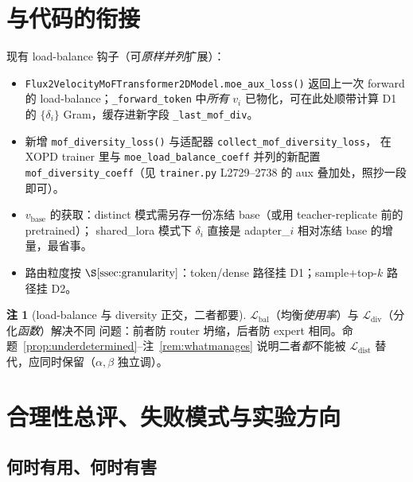 \documentclass[11pt,a4paper]{article}
\newcommand{\loss}{\mathcal{L}}
\newcommand{\base}{\mathrm{base}}
\newcommand{\vbase}{v_{\base}}
\theoremstyle{definition}
\newtheorem{remark}{注}
\begin{document}
\section{与代码的衔接}
\label{sec:code}

现有 load-balance 钩子（可\emph{原样并列}扩展）：
\begin{itemize}[leftmargin=1.5em]
\item \texttt{Flux2VelocityMoFTransformer2DModel.moe\_aux\_loss()} 返回上一次 forward 的
load-balance；\texttt{\_forward\_token} 中\emph{所有} $v_i$ 已物化，可在此处顺带计算 D1 的
$\{\delta_i\}$ Gram，缓存进新字段 \texttt{\_last\_mof\_div}。
\item 新增 \texttt{mof\_diversity\_loss()} 与适配器 \texttt{collect\_mof\_diversity\_loss}，
在 XOPD trainer 里与 \texttt{moe\_load\_balance\_coeff} 并列的新配置
\texttt{mof\_diversity\_coeff}（见 \texttt{trainer.py} L2729--2738 的 aux 叠加处，照抄一段即可）。
\item $\vbase$ 的获取：distinct 模式需另存一份冻结 base（或用 teacher-replicate 前的 pretrained）；
shared\_lora 模式下 $\delta_i$ 直接是 adapter\_$i$ 相对冻结 base 的增量，最省事。
\item 路由粒度按 $\S\ref{ssec:granularity}$：token/dense 路径挂 D1；sample$+$top-$k$ 路径挂 D2。
\end{itemize}

\begin{remark}[load-balance 与 diversity 正交，二者都要]
\label{rem:both}
$\loss_{\mathrm{bal}}$（均衡\emph{使用率}）与 $\loss_{\mathrm{div}}$（分化\emph{函数}）解决不同
问题：前者防 router 坍缩，后者防 expert 相同。命题~\ref{prop:underdetermined}--注~\ref{rem:whatmanages}
说明二者\emph{都}不能被 $\loss_{\mathrm{dist}}$ 替代，应同时保留（$\alpha,\beta$ 独立调）。
\end{remark}

\section{合理性总评、失败模式与实验方向}
\label{sec:eval}

\subsection{何时有用、何时有害}
\label{ssec:whenhelp}
\end{document}
